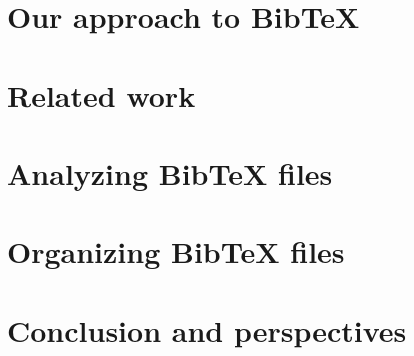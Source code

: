 \documentclass[twoside,11pt,openright,a4paper]{report}
\newcommand{\bibtex}{Bib{\TeX}}
\begin{document}
\chapter{Our approach to {\bibtex}}
\label{ch:approach}


\chapter{Related work}
\label{ch:related}


\chapter{Analyzing {\bibtex} files}
\label{ch:analyzing}


\chapter{Organizing {\bibtex} files}
\label{ch:organizing}


\chapter{Conclusion and perspectives}
\label{ch:conclusion}

\printbibliography{}
\end{document}
